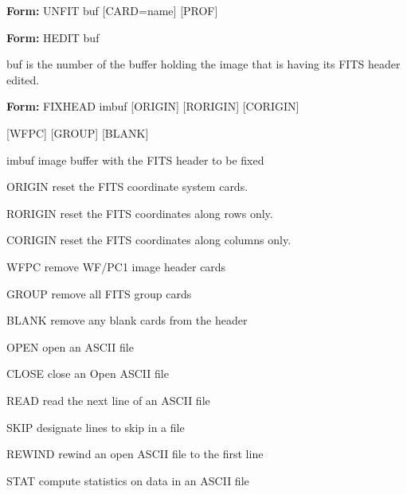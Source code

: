 {\newpage\clearpage
{}%
\begin{command}
  \item[\textbf{Form: } UNFIT buf {[CARD=name]} {[PROF]}\hfill]{}
\end{command}%
\lthtmlfigureZ
\lthtmlcheckvsize\clearpage}

{\newpage\clearpage
{}%
\begin{command} 
  \item[\textbf{Form: } HEDIT buf\hfill]{}
  \item[buf]{is the number of the buffer holding the 
image that is having its FITS header edited.}
\end{command}%
\lthtmlfigureZ
\lthtmlcheckvsize\clearpage}

{\newpage\clearpage
{}%
\begin{command} 
  \item[\textbf{Form: } FIXHEAD imbuf {[ORIGIN]} {[RORIGIN]} 
       {[CORIGIN]}\hfill]{}
  \item{{[WFPC]} {[GROUP]} {[BLANK]} }
  \item[imbuf]{image buffer with the FITS header to be fixed}
  \item[ORIGIN]{reset the FITS coordinate system cards.}
  \item[RORIGIN]{reset the FITS coordinates along rows only.}
  \item[CORIGIN]{reset the FITS coordinates along columns only.}
  \item[WFPC]{remove WF/PC1 image header cards}
  \item[GROUP]{remove all FITS group cards}
  \item[BLANK]{remove any blank cards from the header}
\end{command}%
\lthtmlfigureZ
\lthtmlcheckvsize\clearpage}

{\newpage\clearpage
{}%
\begin{example}
  \item[OPEN]{open an ASCII file}
  \item[CLOSE]{close an Open ASCII file}
  \item[READ]{read the next line of an ASCII file}
  \item[SKIP]{designate lines to skip in a file}
  \item[REWIND]{rewind an open ASCII file to the first line}
  \item[STAT]{compute statistics on data in an ASCII file}
\end{example}%
\lthtmlfigureZ
\lthtmlcheckvsize\clearpage}

